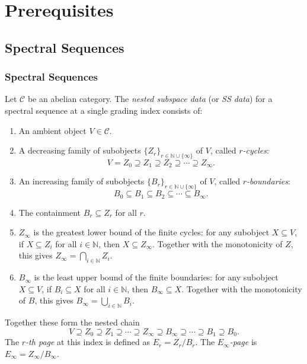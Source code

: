 
\section{Prerequisites}\label{sec:prereq}

\subsection{Spectral Sequences}\label{sec:prereq-ss}

\subsubsection{Spectral Sequences}\label{sec:prereq-ss-def}

\begin{definition}\label{prereq:def:ss-data}
    \leanok
    Let $\mathcal{C}$ be an abelian category. The \emph{nested subspace data} (or \emph{SS data}) for a spectral sequence at a single grading index consists of:
    \begin{enumerate}
        \item An ambient object $V \in \mathcal{C}$.
        \item A decreasing family of subobjects $\{Z_r\}_{r \in \mathbb{N} \cup \{\infty\}}$ of $V$, called \emph{$r$-cycles}:
        $$V = Z_0 \supseteq Z_1 \supseteq Z_2 \supseteq \cdots \supseteq Z_\infty.$$
        \item An increasing family of subobjects $\{B_r\}_{r \in \mathbb{N} \cup \{\infty\}}$ of $V$, called \emph{$r$-boundaries}:
        $$B_0 \subseteq B_1 \subseteq B_2 \subseteq \cdots \subseteq B_\infty.$$
        \item The containment $B_r \subseteq Z_r$ for all $r$.
        \item $Z_\infty$ is the greatest lower bound of the finite cycles: for any subobject $X \subseteq V$, if $X \subseteq Z_i$ for all $i \in \mathbb{N}$, then $X \subseteq Z_\infty$. Together with the monotonicity of $Z$, this gives $Z_\infty = \bigcap_{i \in \mathbb{N}} Z_i$.
        \item $B_\infty$ is the least upper bound of the finite boundaries: for any subobject $X \subseteq V$, if $B_i \subseteq X$ for all $i \in \mathbb{N}$, then $B_\infty \subseteq X$. Together with the monotonicity of $B$, this gives $B_\infty = \bigcup_{i \in \mathbb{N}} B_i$.
    \end{enumerate}
    Together these form the nested chain
    $$V \supseteq Z_0 \supseteq Z_1 \supseteq \cdots \supseteq Z_\infty \supseteq B_\infty \supseteq \cdots \supseteq B_1 \supseteq B_0.$$
    The \emph{$r$-th page} at this index is defined as $E_r = Z_r / B_r$. The \emph{$E_\infty$-page} is $E_\infty = Z_\infty / B_\infty$.
\end{definition}

